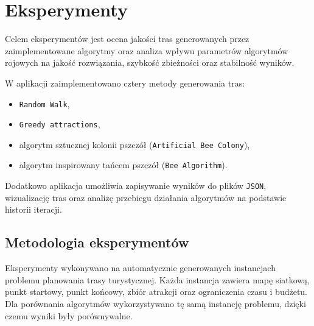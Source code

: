 \section{Eksperymenty}
\label{sec:eksperymenty}

Celem eksperymentów jest ocena jakości tras generowanych przez zaimplementowane
algorytmy oraz analiza wpływu parametrów algorytmów rojowych na jakość
rozwiązania, szybkość zbieżności oraz stabilność wyników.

W aplikacji zaimplementowano cztery metody generowania tras:
\begin{itemize}
    \item \texttt{Random Walk},
    \item \texttt{Greedy attractions},
    \item algorytm sztucznej kolonii pszczół (\texttt{Artificial Bee Colony}),
    \item algorytm inspirowany tańcem pszczół (\texttt{Bee Algorithm}).
\end{itemize}

Dodatkowo aplikacja umożliwia zapisywanie wyników do plików \texttt{JSON},
wizualizację tras oraz analizę przebiegu działania algorytmów na podstawie
historii iteracji.

\subsection{Metodologia eksperymentów}

Eksperymenty wykonywano na automatycznie generowanych instancjach problemu
planowania trasy turystycznej. Każda instancja zawiera mapę siatkową, punkt
startowy, punkt końcowy, zbiór atrakcji oraz ograniczenia czasu i budżetu.
Dla porównania algorytmów wykorzystywano tę samą instancję problemu, dzięki
czemu wyniki były porównywalne.

